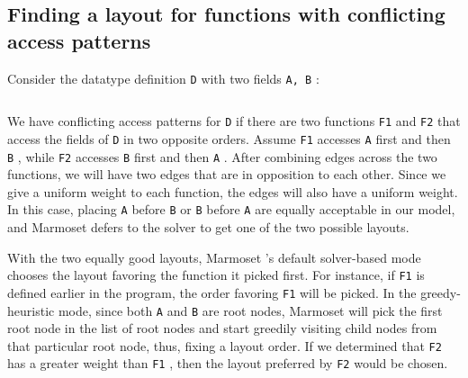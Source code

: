 \documentclass[acmsmall,review,anonymous]{acmart}\settopmatter{printfolios=true,printccs=false,printacmref=false}
\newcommand{\system}{{\sc Marmoset}\xspace}
\providecommand{\DIFaddtex}[1]{{\protect\color{blue} \sf #1}} %
\providecommand{\DIFaddbegin}{} %
\providecommand{\DIFmodbegin}{} %
\providecommand{\DIFmodend}{} %
\providecommand{\DIFadd}[1]{\texorpdfstring{\DIFaddtex{#1}}{#1}} %
\newcommand{\DIFaddincludegraphics}[2][]{{\color{blue}\fbox{\DIFOincludegraphics[#1]{#2}}}} %
\DeclareRobustCommand{\DIFaddbegin}{\DIFOaddbegin \let\includegraphics\DIFaddincludegraphics} %
\begin{document}
\DIFaddbegin \subsection{\DIFadd{Finding a layout for functions with conflicting access patterns}}
\label{design:conflicting-access-patterns}
\DIFadd{Consider the datatype definition }{\color{blue}%
\lstinline|D| %
}%
\DIFadd{with two fields }{\color{blue}%
\lstinline|A, B|%
}%
\DIFadd{:
}\DIFmodbegin
\begin{lstlisting}[alsolanguage=DIFcode]
%DIF >     data D = D A B
\end{lstlisting}
\DIFmodend
\DIFadd{We have conflicting access patterns for }{\color{blue}%
\lstinline|D|
%
}%
\DIFadd{if there are two functions }{\color{blue}%
\lstinline|F1| %
}%
\DIFadd{and }{\color{blue}%
\lstinline|F2| %
}%
\DIFadd{that access the fields of }{\color{blue}%
\lstinline|D| %
}%
\DIFadd{in two opposite orders.
Assume }{\color{blue}%
\lstinline|F1| %
}%
\DIFadd{accesses }{\color{blue}%
\lstinline|A| %
}%
\DIFadd{first and then }{\color{blue}%
\lstinline|B|%
}%
\DIFadd{, while }{\color{blue}%
\lstinline|F2|
%
}%
\DIFadd{accesses }{\color{blue}%
\lstinline|B| %
}%
\DIFadd{first and then }{\color{blue}%
\lstinline|A|%
}%
\DIFadd{. After combining edges across the two functions, we will have two edges that
are in opposition to each other. Since we give a uniform weight to each function, the edges will also have a uniform weight.
In this case,
placing }{\color{blue}%
\lstinline|A| %
}%
\DIFadd{before }{\color{blue}%
\lstinline|B| %
}%
\DIFadd{or }{\color{blue}%
\lstinline|B| %
}%
\DIFadd{before }{\color{blue}%
\lstinline|A| %
}%
\DIFadd{are equally acceptable in our model, and
}\system \DIFadd{defers to the solver to get one of the two possible layouts.
}

\DIFadd{With the two equally good layouts, }\system\DIFadd{'s default solver-based mode chooses the layout favoring the function it picked first. For instance, if }{\color{blue}%
\lstinline|F1| %
}%
\DIFadd{is defined earlier in the program, the order favoring }{\color{blue}%
\lstinline|F1| %
}%
\DIFadd{will be picked.
In the greedy-heuristic mode, since both }{\color{blue}%
\lstinline|A| %
}%
\DIFadd{and }{\color{blue}%
\lstinline|B| %
}%
\DIFadd{are root nodes, }\system \DIFadd{will pick the
first root node in the list of root nodes and start greedily visiting child nodes from that particular root node, thus, fixing a layout order.
If we determined that }{\color{blue}%
\lstinline|F2| %
}%
\DIFadd{has a greater weight than }{\color{blue}%
\lstinline|F1|%
}%
\DIFadd{, then the layout preferred by
}{\color{blue}%
\lstinline|F2| %
}%
\DIFadd{would be chosen.
}
\end{document}
